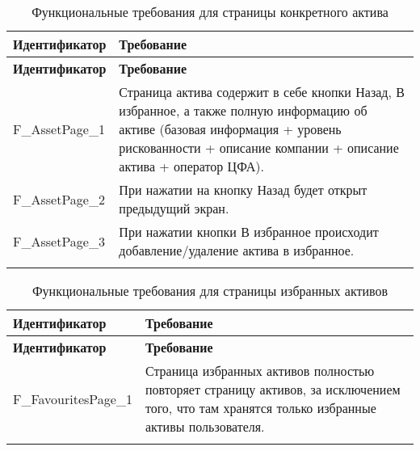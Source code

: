 \documentclass[a4paper, 14pt]{article}
\begin{document}
\begin{longtable}{| p{} | p{} |}
    \hline
    \textbf{Идентификатор}          & \textbf{Требование}                                                                                                                                                                \\
    \hline
    \endfirsthead
    \hline
    \textbf{Идентификатор}          & \textbf{Требование}                                                                                                                                                                \\
    \hline
    \endhead

    F\_AssetPage\_1                 & Страница актива содержит в себе кнопки Назад, В избранное, а также полную информацию об активе (базовая информация + уровень рискованности + описание компании + описание актива + оператор ЦФА).                         \\ \hline
    F\_AssetPage\_2                 & При нажатии на кнопку Назад будет открыт предыдущий экран.                                                                                                                         \\ \hline
    F\_AssetPage\_3                 & При нажатии кнопки В избранное происходит добавление/удаление актива в избранное.                                                                                                  \\ \hline

    \caption{Функциональные требования для страницы конкретного актива}
\end{longtable}

\begin{longtable}{| p{} | p{} |}
    \hline
    \textbf{Идентификатор}          & \textbf{Требование}                                                                                                                                                                \\
    \hline
    \endfirsthead
    \hline
    \textbf{Идентификатор}          & \textbf{Требование}                                                                                                                                                                \\
    \hline
    \endhead

    F\_FavouritesPage\_1            & Страница избранных активов полностью повторяет страницу активов, за исключением того, что там хранятся только избранные активы пользователя.                                       \\ \hline

    \caption{Функциональные требования для страницы избранных активов}
\end{longtable}
\end{document}

